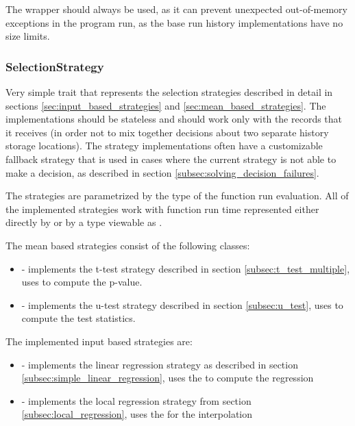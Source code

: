 The  wrapper should always be used, as it can prevent unexpected out-of-memory exceptions in the program run, as the base run history implementations have no size limits.

\subsubsection{SelectionStrategy}
\label{subsubsec:selection_strategy_impl}

Very simple trait that represents the selection strategies described in detail in sections \ref{sec:input_based_strategies} and \ref{sec:mean_based_strategies}. The implementations should be stateless and should work only with the  records that it receives (in order not to mix together decisions about two separate history storage locations). The strategy implementations often have a customizable fallback strategy that is used in cases where the current strategy is not able to make a decision, as described in section \ref{subsec:solving_decision_failures}.

The strategies are parametrized by the  type of the function run evaluation. All of the implemented strategies work with function run time represented either directly by  or by a type viewable as .

The mean based strategies consist of the following classes:
\begin{itemize}
	\item {} - implements the t-test strategy described in section \ref{subsec:t_test_multiple}, uses \cite{noauthor_apachemath_nodate} to compute the p-value.
	\item {} - implements the u-test strategy described in section \ref{subsec:u_test}, uses \cite{noauthor_apachemath_nodate} to compute the test statistics.
\end{itemize}

The implemented input based strategies are:
\begin{itemize}
	\item {} - implements the linear regression strategy as described in section \ref{subsec:simple_linear_regression}, uses the \cite{noauthor_apachemath_nodate} to compute the regression

	\item {} - implements the local regression strategy from section \ref{subsec:local_regression}, uses the \cite{noauthor_apachemath_nodate} for the interpolation
\end{itemize}


